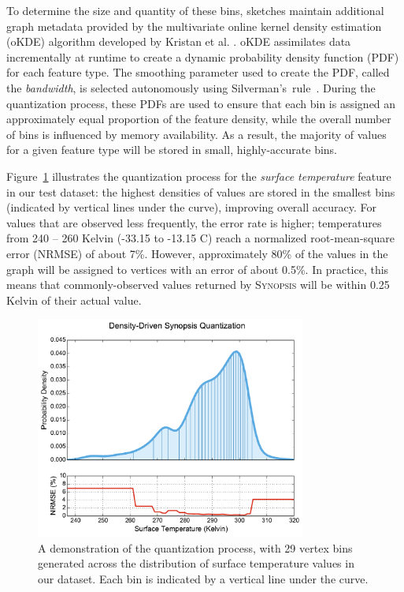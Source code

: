 To determine the size and quantity of these bins, sketches maintain additional graph metadata provided by the multivariate online kernel density estimation (oKDE) algorithm developed by Kristan et al. \cite{kristan2011multivariate}. oKDE assimilates data incrementally at runtime to create a dynamic probability density function (PDF) for each feature type. The smoothing parameter used to create the PDF, called the \emph{bandwidth}, is selected autonomously using Silverman's~rule~\cite{silverman1986density}. During the quantization process, these PDFs are used to ensure that each bin is assigned an approximately equal proportion of the feature density, while the overall number of bins is influenced by memory availability. As a result, the majority of values for a given feature type will be stored in small, highly-accurate bins.

Figure~\ref{fig:quantization} illustrates the quantization process for the \emph{surface temperature} feature in our test dataset: the highest densities of values are stored in the smallest bins (indicated by vertical lines under the curve), improving overall accuracy. For values that are observed less frequently, the error rate is higher; temperatures from 240 -- 260 Kelvin (-33.15 to -13.15 \degree C) reach a normalized root-mean-square error (NRMSE) of about 7\%. However, approximately 80\% of the values in the graph will be assigned to vertices with an error of about 0.5\%. In practice, this means that commonly-observed values returned by \textsc{Synopsis} will be within 0.25 Kelvin of their actual value.

\begin{figure}
    \centerline{\includegraphics[width=3.5in]{figures/quantization.pdf}}
    \caption{A demonstration of the quantization process, with 29 vertex bins generated across the distribution of surface temperature values in our dataset. Each bin is indicated by a vertical line under the curve.}
    \label{fig:quantization}
\end{figure}

